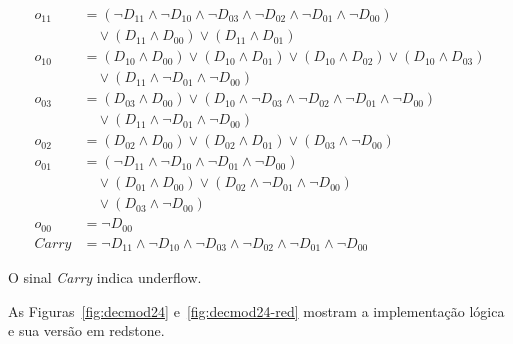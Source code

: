 \begin{align*}
    o_{11} &= (\lnot D_{11} \land \lnot D_{10} \land \lnot D_{03} \land \lnot D_{02} \land \lnot D_{01} \land \lnot D_{00}) \\
    &\quad \lor (D_{11} \land D_{00}) \lor (D_{11} \land D_{01}) \\[4pt]
    o_{10} &= (D_{10} \land D_{00}) \lor (D_{10} \land D_{01}) \lor (D_{10} \land D_{02}) \lor (D_{10} \land D_{03}) \\
    &\quad \lor (D_{11} \land \lnot D_{01} \land \lnot D_{00}) \\[4pt]
    o_{03} &= (D_{03} \land D_{00}) \lor (D_{10} \land \lnot D_{03} \land \lnot D_{02} \land \lnot D_{01} \land \lnot D_{00}) \\
    &\quad \lor (D_{11} \land \lnot D_{01} \land \lnot D_{00}) \\[4pt]
    o_{02} &= (D_{02} \land D_{00}) \lor (D_{02} \land D_{01}) \lor (D_{03} \land \lnot D_{00}) \\[4pt]
    o_{01} &= (\lnot D_{11} \land \lnot D_{10} \land \lnot D_{01} \land \lnot D_{00}) \\
    &\quad \lor (D_{01} \land D_{00}) \lor (D_{02} \land \lnot D_{01} \land \lnot D_{00}) \\
    &\quad \lor (D_{03} \land \lnot D_{00}) \\[4pt]
    o_{00} &= \lnot D_{00} \\[4pt]
    Carry &= \lnot D_{11} \land \lnot D_{10} \land \lnot D_{03} \land \lnot D_{02} \land \lnot D_{01} \land \lnot D_{00}
\end{align*}

O sinal \textit{Carry} indica underflow.

As Figuras~\ref{fig:decmod24} e~\ref{fig:decmod24-red} mostram a implementação lógica e sua versão em redstone.

